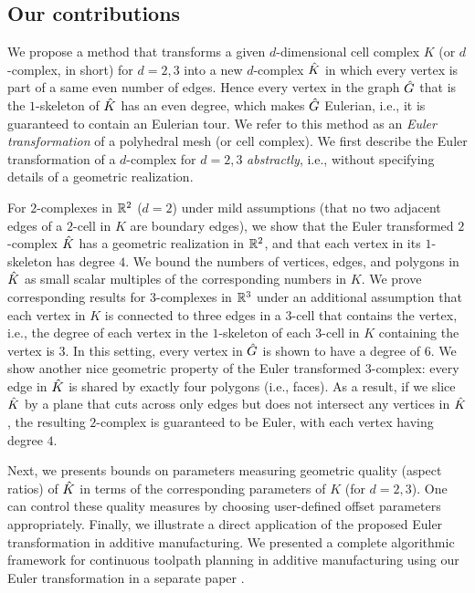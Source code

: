 \subsection{Our contributions} \label{ssec:contrib}

We propose a method that transforms a given $d$-dimensional cell complex $K$ (or $d$-complex, in short) for $d=2,3$ into a new $d$-complex $\hat{K}$ in which every vertex is part of a same even number of edges.
Hence every vertex in the graph $\hat{G}$ that is the $1$-skeleton of $\hat{K}$ has an even degree, which makes $\hat{G}$ Eulerian, i.e., it is guaranteed to contain an Eulerian tour.
We refer to this method as an \emph{Euler transformation} of a polyhedral mesh (or cell complex).
We first describe the Euler transformation of a $d$-complex for $d=2,3$ \emph{abstractly}, i.e., without specifying details of a geometric realization.

For $2$-complexes in ${\mathbb R}^2$ ($d=2$) under mild assumptions (that no two adjacent edges of a $2$-cell in $K$ are boundary edges), we show that the Euler transformed $2$-complex $\hat{K}$ has a geometric realization in ${\mathbb R}^2$, and that each vertex in its $1$-skeleton has degree $4$.
We bound the numbers of vertices, edges, and polygons in $\hat{K}$ as small scalar multiples of the corresponding numbers in $K$.
We prove corresponding results for $3$-complexes in ${\mathbb R}^3$ under an additional assumption that each vertex in $K$ is connected to three edges in a $3$-cell that contains the vertex, i.e., the degree of each vertex in the $1$-skeleton of each $3$-cell in $K$ containing the vertex is $3$.
In this setting, every vertex in $\hat{G}$ is shown to have a degree of $6$.
We show another nice geometric property of the Euler transformed $3$-complex: every edge in $\hat{K}$ is shared by exactly four polygons (i.e., faces).
As a result, if we slice $\hat{K}$ by a plane that cuts across only edges but does not intersect any vertices  in $\hat{K}$, the resulting $2$-complex is guaranteed to be Euler, with each vertex having degree $4$.

Next, we presents bounds on parameters measuring geometric quality (aspect ratios) of $\hat{K}$ in terms of the corresponding parameters of $K$ (for $d=2, 3$).
One can control these quality measures by choosing user-defined offset parameters appropriately.
Finally, we illustrate a direct application of the proposed Euler transformation in additive manufacturing. We presented a complete algorithmic framework for continuous toolpath planning in additive manufacturing using our Euler transformation in a separate paper \cite{GuKrDr2020}.

